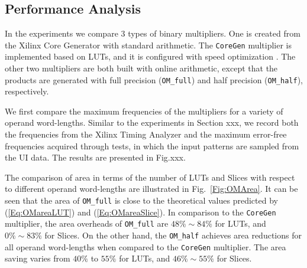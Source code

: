 \documentclass[conference]{IEEEtran}
\begin{document}
\subsection{Performance Analysis}
In the experiments we compare 3 types of binary multipliers. One is created from the Xilinx Core Generator with standard arithmetic. The \texttt{CoreGen} multiplier is implemented based on LUTs, and it is configured with speed optimization \cite{XilinxMult} . The other two multipliers are both built with online arithmetic, except that the products are generated with full precision (\texttt{OM\_full}) and half precision (\texttt{OM\_half}), respectively.

We first compare the maximum frequencies of the multipliers for a variety of operand word-lengths. Similar to the experiments in Section xxx, we record both the frequencies from the Xilinx Timing Analyzer and the maximum error-free frequencies acquired through tests, in which the input patterns are sampled from the UI data. The results are presented in Fig.xxx.



The comparison of area in terms of the number of LUTs and Slices with respect to different operand word-lengths are illustrated in Fig.~\ref{Fig:OMArea}. It can be seen that the area of \texttt{OM\_full} is close to the theoretical values predicted by (\ref{Eq:OMareaLUT}) and (\ref{Eq:OMareaSlice}). In comparison to the \texttt{CoreGen} multiplier, the area overheads of \texttt{OM\_full} are $48\%\sim84\%$ for LUTs, and $0\%\sim83\%$ for Slices. On the other hand, the \texttt{OM\_half} achieves area reductions for all operand word-lengths when compared to the \texttt{CoreGen} multiplier. The area saving varies from $40\%$ to $55\%$ for LUTs, and $46\%\sim55\%$ for Slices.
\end{document}
